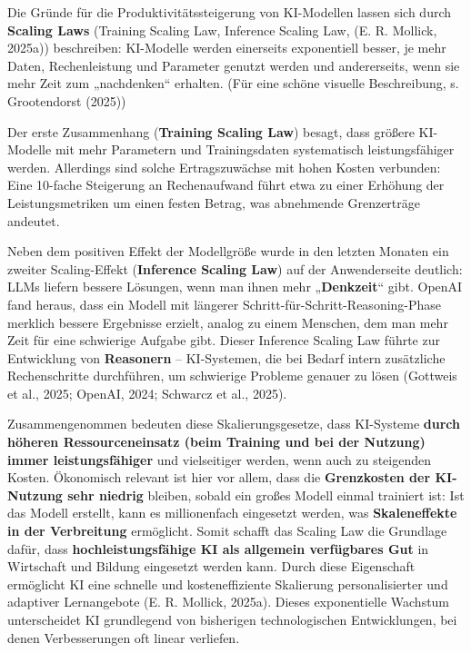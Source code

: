 \documentclass[
  ngerman,
  letterpaper,
  DIV=11]{scrreprt}
\begin{document}
Die Gründe für die Produktivitätssteigerung von KI-Modellen lassen sich
durch \textbf{Scaling Laws} (Training Scaling Law, Inference Scaling
Law, (E. R. Mollick, 2025a)) beschreiben: KI-Modelle werden einerseits
exponentiell besser, je mehr Daten, Rechenleistung und Parameter genutzt
werden und andererseits, wenn sie mehr Zeit zum „nachdenken`` erhalten.
(Für eine schöne visuelle Beschreibung, s. Grootendorst (2025))

Der erste Zusammenhang (\textbf{Training Scaling Law}) besagt, dass
größere KI-Modelle mit mehr Parametern und Trainingsdaten systematisch
leistungsfähiger werden. Allerdings sind solche Ertragszuwächse mit
hohen Kosten verbunden: Eine 10-fache Steigerung an Rechenaufwand führt
etwa zu einer Erhöhung der Leistungsmetriken um einen festen Betrag, was
abnehmende Grenzerträge andeutet.

Neben dem positiven Effekt der Modellgröße wurde in den letzten Monaten
ein zweiter Scaling-Effekt (\textbf{Inference Scaling Law}) auf der
Anwenderseite deutlich: LLMs liefern bessere Lösungen, wenn man ihnen
mehr „\textbf{Denkzeit}`` gibt. OpenAI fand heraus, dass ein Modell mit
längerer Schritt-für-Schritt-Reasoning-Phase merklich bessere Ergebnisse
erzielt, analog zu einem Menschen, dem man mehr Zeit für eine schwierige
Aufgabe gibt. Dieser Inference Scaling Law führte zur Entwicklung von
\textbf{Reasonern} -- KI-Systemen, die bei Bedarf intern zusätzliche
Rechenschritte durchführen, um schwierige Probleme genauer zu lösen
(Gottweis et al., 2025; OpenAI, 2024; Schwarcz et al., 2025).

Zusammengenommen bedeuten diese Skalierungsgesetze, dass KI-Systeme
\textbf{durch höheren Ressourceneinsatz (beim Training und bei der
Nutzung) immer leistungsfähiger} und vielseitiger werden, wenn auch zu
steigenden Kosten. Ökonomisch relevant ist hier vor allem, dass die
\textbf{Grenzkosten der KI-Nutzung sehr niedrig} bleiben, sobald ein
großes Modell einmal trainiert ist: Ist das Modell erstellt, kann es
millionenfach eingesetzt werden, was \textbf{Skaleneffekte in der
Verbreitung} ermöglicht. Somit schafft das Scaling Law die Grundlage
dafür, dass \textbf{hochleistungsfähige KI als allgemein verfügbares
Gut} in Wirtschaft und Bildung eingesetzt werden kann. Durch diese
Eigenschaft ermöglicht KI eine schnelle und kosteneffiziente Skalierung
personalisierter und adaptiver Lernangebote (E. R. Mollick, 2025a).
Dieses exponentielle Wachstum unterscheidet KI grundlegend von
bisherigen technologischen Entwicklungen, bei denen Verbesserungen oft
linear verliefen.
\end{document}
